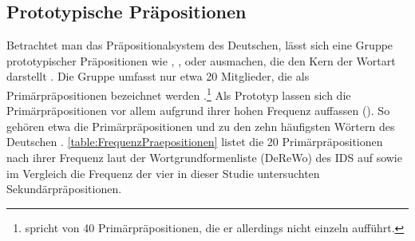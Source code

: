 \subsection{Prototypische Präpositionen} \label{sec:Primaer}
Betrachtet man das Präpositionalsystem des Deutschen, lässt sich eine Gruppe prototypischer Präpositionen wie , , oder  ausmachen, die den Kern der Wortart darstellt \citep[s.][214]{DiMeola2011}. 
Die Gruppe umfasst nur etwa 20 Mitglieder, die als Primärpräpositionen bezeichnet werden \citep[s.][94]{Szczepaniak2011}.\footnote{\citet[146]{Buscha1984} spricht von 40 Primärpräpositionen, die er allerdings nicht einzeln aufführt.}  
Als Prototyp lassen sich die Primärpräpositionen vor allem aufgrund ihrer hohen Frequenz auffassen (\cites[s.][631]{Griehaber2009}[94]{Szczepaniak2011}[§1429]{Duden2022}).
So gehören etwa die Primärpräpositionen  und  zu den zehn häufigsten Wörtern des Deutschen \citep[s.][]{InstitutfurDeutscheSprache2012}. 
\autoref{table:FrequenzPraepositionen} listet die 20 Primärpräpositionen nach ihrer Frequenz laut der Wortgrundformenliste (DeReWo) des IDS auf sowie im Vergleich die Frequenz der vier in dieser Studie untersuchten Sekundärpräpositionen.
